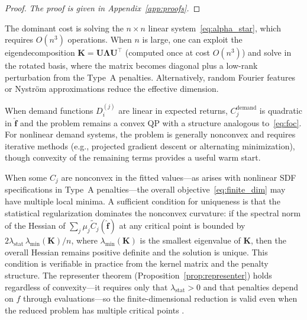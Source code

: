 \begin{proof}
\emph{The proof is given in Appendix~\ref{app:proofs}.}
\end{proof}

\begin{remark}
\label{rem:computation}
The dominant cost is solving the $n \times n$ linear system~\eqref{eq:alpha_star},
which requires $O(n^3)$ operations.
When $n$ is large, one can exploit the eigendecomposition
$\mathbf{K} = \mathbf{U}\boldsymbol{\Lambda}\mathbf{U}^\top$
(computed once at cost $O(n^3)$) and solve in the rotated basis,
where the matrix becomes diagonal plus a low-rank perturbation from
the Type~A penalties.
Alternatively, random Fourier features or Nystr\"{o}m approximations
reduce the effective dimension.
\end{remark}

\begin{remark}
\label{rem:type_d_convexity}
When demand functions $D_i^{(j)}$ are linear in expected returns,
$C_j^{\mathrm{demand}}$ is quadratic in $\hat{\mathbf{f}}$ and the
problem remains a convex QP with a structure analogous to~\eqref{eq:foc}.
For nonlinear demand systems, the problem is generally nonconvex and
requires iterative methods (e.g., projected gradient descent or
alternating minimization), though convexity of the remaining terms
provides a useful warm start.
\end{remark}

\begin{remark}
\label{rem:uniqueness_nonconvex}
When some $C_j$ are nonconvex in the fitted values---as arises with
nonlinear SDF specifications in Type~A penalties---the overall
objective~\eqref{eq:finite_dim} may have multiple local minima.
A sufficient condition for uniqueness is that the statistical
regularization dominates the nonconvex curvature:
if the spectral norm of the Hessian of
$\sum_j \mu_j \tilde{C}_j(\hat{\mathbf{f}})$ at any critical point
is bounded by $2\lambda_{\mathrm{stat}}\,\lambda_{\min}(\mathbf{K})/n$,
where $\lambda_{\min}(\mathbf{K})$ is the smallest eigenvalue of
$\mathbf{K}$, then the overall Hessian remains positive definite and
the solution is unique.
This condition is verifiable in practice from the kernel matrix
and the penalty structure.
The representer theorem (Proposition~\ref{prop:representer})
holds regardless of convexity---it requires only that $\lambda_{\mathrm{stat}} > 0$
and that penalties depend on $f$ through evaluations---so the
finite-dimensional reduction is valid even when the reduced problem
has multiple critical points \citep{bodin2024random}.
\end{remark}

